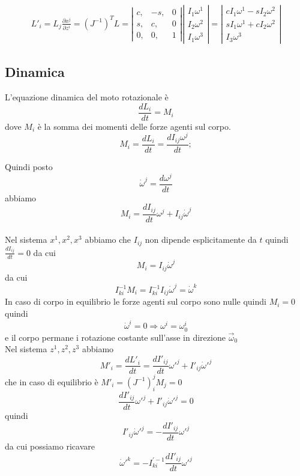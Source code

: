 \documentclass[a4paper,11pt]{article}
\begin{document}
\begin{eqnarray*}
	L'_i = L_j \frac{\partial x^j}{\partial z^i} = ( J^{-1} )^T L
	= 
	\left|
\begin{array}{lll}
	c, & -s, & 0
\\
	s, &c, & 0
\\
	0, & 0, & 1
\end{array}
	\right|
	\left|
\begin{array}{l}
	I_1 \omega^1
\\
	I_2 \omega^2
\\
	I_1 \omega^3
\end{array}
	\right|
= 
	\left|
\begin{array}{l}
	c I_1 \omega^1 - s I_2 \omega^2
\\
	s I_1 \omega^1 + c I_2 \omega^2
\\
	I_3 \omega^3
\end{array}
	\right|
\end{eqnarray*}


\subsection{Dinamica}

L'equazione dinamica del moto rotazionale è
\[
	\frac{d L_i}{dt} = M_i
\]
dove $ M_i $ è la somma dei momenti delle forze agenti sul corpo.
\[
	M_i = \frac{d L_i}{dt} = \frac{d I_{ij} \omega^j}{dt};
\]

Quindi posto
\[
\dot \omega^j = \frac{d  \omega^j}{dt}
\]
abbiamo
\begin{equation}
	M_i = \frac{d I_{ij}}{dt} \omega^j + I_{ij} \dot \omega^j 
\end{equation}
\\

Nel sistema $ x^1, x^2, x^3 $ abbiamo che $ I_{ij} $ non dipende esplicitamente da $ t $ quindi $ \frac{d I_{ij}}{dt} = 0 $ da cui
\[
	M_i = I_{ij} \dot \omega^j
\]
da cui
\[
	I^{-1}_{ki} M_i = I^{-1}_{ki} I_{ij} \dot \omega^j = \dot \omega^k
\]
In caso di corpo in equilibrio le forze agenti sul corpo sono nulle quindi $ M_i = 0 $ quindi 
\[
	\dot \omega^i = 0 \Rightarrow \omega^i = \omega_0^i
\]
e il corpo permane i rotazione costante sull'asse in direzione $ \vec \omega_0 $
\\

Nel sistema $ z^1, z^2, z^3 $ abbiamo
\[
	M'_i = \frac{dL'_i}{dt} = \frac{d I'_{ij}}{dt} {\omega'}^j + I'_{ij} \dot \omega'^j
\]
che in caso di equilibrio è $ M'_i = ({J^{-1}})_i^j M_j = 0 $
\[
	\frac{d I'_{ij}}{dt} {\omega'}^j + I'_{ij} \dot \omega'^j = 0
\]
quindi 
\[
	I'_{ij} \dot \omega'^j = -\frac{d I'_{ij}}{dt} {\omega'}^j
\]
da cui possiamo ricavare
\begin{equation}
	\dot \omega'^k = -I_{ki}^{'-1} \frac{d I'_{ij}}{dt} {\omega'}^j
\end{equation}
\end{document}
